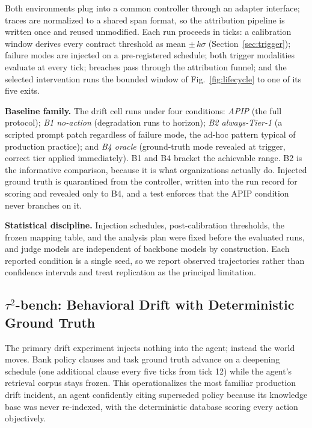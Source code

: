 \documentclass[conference]{IEEEtran}
\begin{document}
Both environments plug into a common controller through an adapter interface;
traces are normalized to a shared span format, so the attribution pipeline is
written once and reused unmodified. Each run proceeds in ticks: a calibration
window derives every contract threshold as mean $\pm\,k\sigma$
(Section~\ref{sec:trigger}); failure modes are injected on a pre-registered
schedule; both trigger modalities evaluate at every tick; breaches pass through
the attribution funnel; and the selected intervention runs the bounded window
of Fig.~\ref{fig:lifecycle} to one of its five exits.

\textbf{Baseline family.} The drift cell runs under four conditions:
\emph{APIP} (the full protocol); \emph{B1 no-action} (degradation runs to
horizon); \emph{B2 always-Tier-1} (a scripted prompt patch regardless of
failure mode, the ad-hoc pattern typical of production practice); and
\emph{B4 oracle} (ground-truth mode revealed at trigger, correct tier applied
immediately). B1 and B4 bracket the achievable range. B2 is the informative
comparison, because it is what organizations actually do. Injected ground truth
is quarantined from the controller, written into the run record for scoring and
revealed only to B4, and a test enforces that the APIP condition never branches
on it.

\textbf{Statistical discipline.} Injection schedules, post-calibration
thresholds, the frozen mapping table, and the analysis plan were fixed before
the evaluated runs, and judge models are independent of backbone models by
construction. Each reported condition is a single seed, so we report observed
trajectories rather than confidence intervals and treat replication as the
principal limitation.

\subsection{$\tau^2$-bench: Behavioral Drift with Deterministic Ground Truth}
\label{sec:taubench}

The primary drift experiment injects nothing into the agent; instead the world
moves. Bank policy clauses and task ground truth advance on a deepening
schedule (one additional clause every five ticks from tick 12) while the
agent's retrieval corpus stays frozen. This operationalizes the most familiar
production drift incident, an agent confidently citing superseded policy
because its knowledge base was never re-indexed, with the deterministic
database scoring every action objectively.
\end{document}
